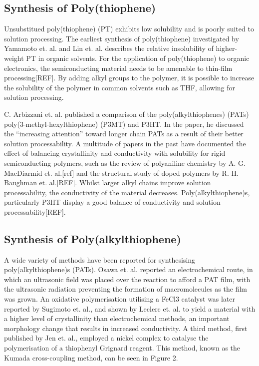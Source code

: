 \subsection{Synthesis of Poly(thiophene)}

Unsubstitued poly(thiophene) (PT) exhibits low solubility and is poorly suited to solution processing. The earliest synthesis of poly(thiophene) investigated by Yamamoto et. al. and Lin et. al. describes the relative insolubility of higher-weight PT in organic solvents. For the application of poly(thiophene) to organic electronics, the semiconducting material needs to be amenable to thin-film processing[REF]. By adding alkyl groups to the polymer, it is possible to increase the solubility of the polymer in common solvents such as THF, allowing for solution processing.

C. Arbizzani et. al. published a comparison of the poly(alkylthiophenes) (PATs) poly(3-methyl-hexylthiophene) (P3MT) and P3HT. In the paper, he discussed the “increasing attention” toward longer chain PATs as a result of their better solution processability. A multitude of papers in the past have documented the effect of balancing crystallinity and conductivity with solubility for rigid semiconducting polymers, such as the review of polyaniline chemistry by A. G. MacDiarmid et. al.[ref] and the structural study of doped polymers by R. H. Baughman et. al.[REF]. Whilst larger alkyl chains improve solution processability, the conductivity of the material decreases. Poly(alkylthiophene)s, particularly P3HT display a good balance of conductivity and solution processability[REF].


\subsection{Synthesis of Poly(alkylthiophene)}

A wide variety of methods have been reported for synthesising poly(alkylthiophene)s (PATs). Osawa et. al. reported an electrochemical route, in which an ultrasonic field was placed over the reaction to afford a PAT film, with the ultrasonic radiation preventing the formation of macromolecules as the film was grown. An oxidative polymerisation utilising a FeCl3 catalyst was later reported by Sugimoto et. al., and shown by Leclerc et. al. to yield a material with a higher level of crystallinity than electrochemical methods, an important morphology change that results in increased conductivity. A third method, first published by Jen et. al., employed a nickel complex to catalyse the polymerisation of a thiophenyl Grignard reagent. This method, known as the Kumada cross-coupling method, can be seen in Figure 2. 

